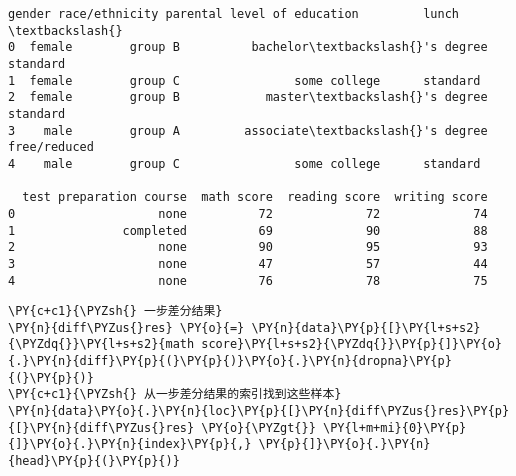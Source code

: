             \begin{tcolorbox}[breakable, size=fbox, boxrule=.5pt, pad at break*=1mm, opacityfill=0]
\begin{Verbatim}[commandchars=\\\{\}]
   gender race/ethnicity parental level of education         lunch  \textbackslash{}
0  female        group B          bachelor\textbackslash{}'s degree      standard
1  female        group C                some college      standard
2  female        group B            master\textbackslash{}'s degree      standard
3    male        group A         associate\textbackslash{}'s degree  free/reduced
4    male        group C                some college      standard

  test preparation course  math score  reading score  writing score
0                    none          72             72             74
1               completed          69             90             88
2                    none          90             95             93
3                    none          47             57             44
4                    none          76             78             75
\end{Verbatim}
\end{tcolorbox}
        
    \begin{tcolorbox}[breakable, size=fbox, boxrule=1pt, pad at break*=1mm,colback=cellbackground, colframe=cellborder]
\begin{Verbatim}[commandchars=\\\{\}]
\PY{c+c1}{\PYZsh{} 一步差分结果}
\PY{n}{diff\PYZus{}res} \PY{o}{=} \PY{n}{data}\PY{p}{[}\PY{l+s+s2}{\PYZdq{}}\PY{l+s+s2}{math score}\PY{l+s+s2}{\PYZdq{}}\PY{p}{]}\PY{o}{.}\PY{n}{diff}\PY{p}{(}\PY{p}{)}\PY{o}{.}\PY{n}{dropna}\PY{p}{(}\PY{p}{)}
\PY{c+c1}{\PYZsh{} 从一步差分结果的索引找到这些样本}
\PY{n}{data}\PY{o}{.}\PY{n}{loc}\PY{p}{[}\PY{n}{diff\PYZus{}res}\PY{p}{[}\PY{n}{diff\PYZus{}res} \PY{o}{\PYZgt{}} \PY{l+m+mi}{0}\PY{p}{]}\PY{o}{.}\PY{n}{index}\PY{p}{,} \PY{p}{]}\PY{o}{.}\PY{n}{head}\PY{p}{(}\PY{p}{)}
\end{Verbatim}
\end{tcolorbox}

